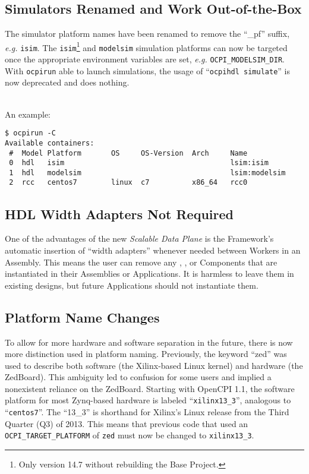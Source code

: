 \subsection{Simulators Renamed and Work Out-of-the-Box}
\label{sec:11_simulators}
The simulator platform names have been renamed to remove the ``\_pf'' suffix, \textit{e.g.} \texttt{isim}. The \texttt{isim}\footnote{Only version 14.7 without rebuilding the Base Project.} and \texttt{modelsim} simulation platforms can now be targeted once the appropriate environment variables are set, \textit{e.g.} \texttt{OCPI\_MODELSIM\_DIR}. With \texttt{ocpirun} able to launch simulations, the usage of ``\texttt{ocpihdl simulate}'' is now deprecated and does nothing.\\
~\\
\begin{minipage}{\linewidth}
An example:
\begin{verbatim}
$ ocpirun -C
Available containers:
 #  Model Platform       OS     OS-Version  Arch     Name
 0  hdl   isim                                       lsim:isim
 1  hdl   modelsim                                   lsim:modelsim
 2  rcc   centos7        linux  c7          x86_64   rcc0
\end{verbatim}
\end{minipage}

\subsection{HDL Width Adapters Not Required}
One of the advantages of the new \textit{Scalable Data Plane} is the Framework's automatic insertion of ``width adapters'' whenever needed between Workers in an Assembly. This means the user can remove any , , or  Components that are instantiated in their Assemblies or Applications. It is harmless to leave them in existing designs, but future Applications should not instantiate them.

\subsection{Platform Name Changes}
\label{sec:11_platform_names}
To allow for more hardware and software separation in the future, there is now more distinction used in platform naming. Previously, the keyword ``zed'' was used to describe both software (the Xilinx-based Linux kernel) and hardware (the ZedBoard). This ambiguity led to confusion for some users and implied a nonexistent reliance on the ZedBoard. Starting with OpenCPI 1.1, the software platform for most Zynq-based hardware is labeled ``\verb+xilinx13_3+'', analogous to ``\verb+centos7+''. The ``13\_3'' is shorthand for Xilinx's Linux release from the Third Quarter (Q3) of 2013. This means that previous code that used an \texttt{OCPI\_TARGET\_PLATFORM} of \texttt{zed} must now be changed to \texttt{xilinx13\_3}.

